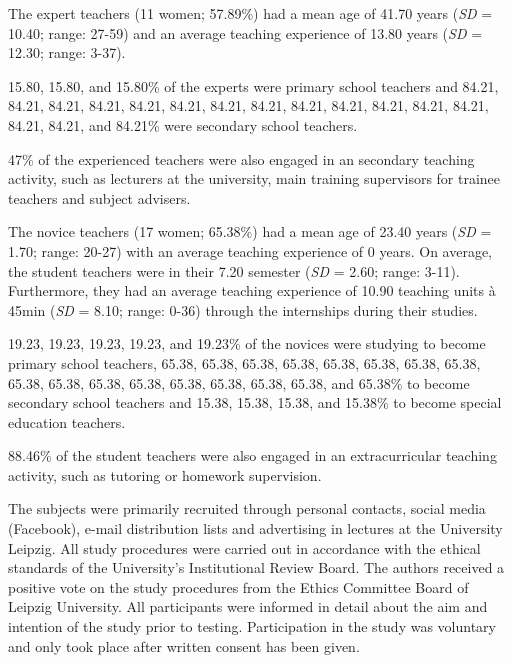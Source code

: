 \documentclass[
  man]{apa6}
\begin{document}
The expert teachers (11 women; 57.89\%) had a mean age of 41.70 years (\emph{SD} = 10.40; range: 27-59) and an average teaching experience of 13.80 years (\emph{SD} = 12.30; range: 3-37).

15.80, 15.80, and 15.80\% of the experts were primary school teachers and 84.21, 84.21, 84.21, 84.21, 84.21, 84.21, 84.21, 84.21, 84.21, 84.21, 84.21, 84.21, 84.21, 84.21, 84.21, and 84.21\% were secondary school teachers.

47\% of the experienced teachers were also engaged in an secondary teaching activity, such as lecturers at the university, main training supervisors for trainee teachers and subject advisers.

The novice teachers (17 women; 65.38\%) had a mean age of 23.40 years (\emph{SD} = 1.70; range: 20-27) with an average teaching experience of 0 years. On average, the student teachers were in their 7.20 semester (\emph{SD} = 2.60; range: 3-11). Furthermore, they had an average teaching experience of 10.90 teaching units à 45min (\emph{SD} = 8.10; range: 0-36) through the internships during their studies.

19.23, 19.23, 19.23, 19.23, and 19.23\% of the novices were studying to become primary school teachers, 65.38, 65.38, 65.38, 65.38, 65.38, 65.38, 65.38, 65.38, 65.38, 65.38, 65.38, 65.38, 65.38, 65.38, 65.38, 65.38, and 65.38\% to become secondary school teachers and 15.38, 15.38, 15.38, and 15.38\% to become special education teachers.

88.46\% of the student teachers were also engaged in an extracurricular teaching activity, such as tutoring or homework supervision.

The subjects were primarily recruited through personal contacts, social media (Facebook), e-mail distribution lists and advertising in lectures at the University Leipzig. All study procedures were carried out in accordance with the ethical standards of the University's Institutional Review Board. The authors received a positive vote on the study procedures from the Ethics Committee Board of Leipzig University. All participants were informed in detail about the aim and intention of the study prior to testing. Participation in the study was voluntary and only took place after written consent has been given.

\hypertarget{section}{%
\subsection{}\label{section}}
\end{document}
